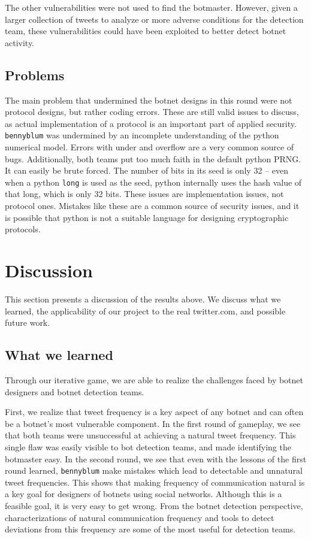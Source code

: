 \documentclass[11pt, oneside]{article} %
\numberwithin{equation}{section} %
\numberwithin{figure}{section} %
\numberwithin{table}{section} %
\renewcommand{\c}[1]{\texttt{#1}}
\newcommand{\code}[1]{\c{#1}}
\newcommand{\teambb}{\c{bennyblum}}
\begin{document}
			The other vulnerabilities were not used to find the botmaster.  However, given a larger collection of tweets to analyze or more adverse conditions for the detection team, these vulnerabilities could have been exploited to better detect botnet activity.

	\subsection{Problems}
		The main problem that undermined the botnet designs in this round were not protocol designs, but rather coding errors.
		These are still valid issues to discuss, as actual implementation of a protocol is an important part of applied security.
		\teambb{} was undermined by an incomplete understanding of the python numerical model. Errors with under and overflow
		are a very common source of bugs. Additionally, both teams put too much faith in the default python PRNG. It can easily
		be brute forced. The number of bits in its seed is only 32 -- even when a python \code{long} is used as the seed, python
		internally uses the hash value of that long, which is only 32 bits. These issues are implementation issues, not protocol
		ones. Mistakes like these are a common source of security issues, and it is possible that python is not a suitable language
		for designing cryptographic protocols.

\section{Discussion}
	This section presents a discussion of the results above. We discuss what we learned, the applicability of our project
	to the real twitter.com, and possible future work.

	\subsection{What we learned}
		Through our iterative game, we are able to realize the challenges faced by botnet designers and botnet detection teams. 

		First, we realize that tweet frequency is a key aspect of any botnet and can often be a botnet's most vulnerable component. In the first round of gameplay, we see that both teams were unsuccessful at achieving a natural tweet frequency. This single flaw was easily visible to bot detection teams, and made identifying the botmaster easy. In the second round, we see that even with the lessons of the first round learned, \teambb{} make mistakes which lead to detectable and unnatural tweet frequencies. This shows that making frequency of communication natural is a key goal for designers of botnets using social networks. Although this is a feasible goal, it is very easy to get wrong. From the botnet detection perspective, characterizations of natural communication frequency and tools to detect deviations from this frequency are some of the most useful for detection teams. 
\end{document}
